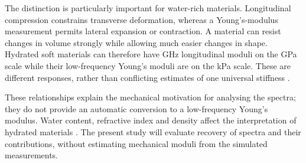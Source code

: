 \documentclass[11pt]{article}
\begin{document}
The distinction is particularly important for water-rich materials. Longitudinal compression constrains transverse deformation, whereas a Young's-modulus measurement permits lateral expansion or contraction. A material can resist changes in volume strongly while allowing much easier changes in shape. Hydrated soft materials can therefore have GHz longitudinal moduli on the GPa scale while their low-frequency Young's moduli are on the kPa scale. These are different responses, rather than conflicting estimates of one universal stiffness \citep{bouvet2025}.

These relationships explain the mechanical motivation for analysing the spectra; they do not provide an automatic conversion to a low-frequency Young's modulus. Water content, refractive index and density affect the interpretation of hydrated materials \citep{wu2018,bouvet2025}. The present study will evaluate recovery of spectra and their contributions, without estimating mechanical moduli from the simulated measurements.


\clearpage

\end{document}
